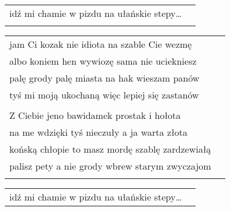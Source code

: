 \documentclass[a5paper]{article}
\begin{document}
\noindent
\begin{tabular}{@{}p{8.00cm}p{3cm}@{}}
idź mi chamie w pizdu na ułańskie stepy…\\\\
\end{tabular}

\noindent
\begin{tabular}{@{}p{8.00cm}p{3cm}@{}}
jam Ci kozak nie idiota na szable Cie wezmę\\
albo koniem hen wywiozę sama nie uciekniesz\\
palę grody palę miasta na hak wieszam panów\\
tyś mi moją ukochaną więc lepiej się zastanów\\\\

Z Ciebie jeno bawidamek prostak i hołota\\
na me wdzięki tyś nieczuły a ja warta złota\\
końską chłopie to masz mordę szablę zardzewiałą\\
palisz pety a nie grody wbrew starym zwyczajom\\\\
\end{tabular}

\noindent
\begin{tabular}{@{}p{8.00cm}p{3cm}@{}}
idź mi chamie w pizdu na ułańskie stepy…
\end{tabular}
\end{document}
